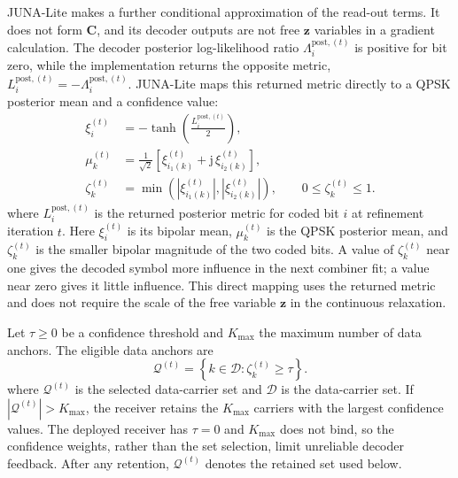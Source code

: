 \documentclass[conference]{IEEEtran}
\newcommand{\Dset}{\mathcal{D}}
\begin{document}
JUNA-Lite makes a further conditional approximation of the read-out terms.
It does not form \(\mathbf C\), and its decoder outputs are not free
\(\mathbf z\) variables in a gradient calculation.  The decoder posterior
log-likelihood ratio \(\Lambda_i^{\mathrm{post},(t)}\) is positive for bit
zero, while the implementation returns the opposite metric,
\(L_i^{\mathrm{post},(t)}=-\Lambda_i^{\mathrm{post},(t)}\).  JUNA-Lite maps
this returned metric directly to a QPSK posterior mean and a confidence value:
\begin{align}
  \xi_i^{(t)}
  &=-\tanh\!\left(\frac{L_i^{\mathrm{post},(t)}}{2}\right),
  \label{eq:lite-posterior-bit}\\
  \mu_k^{(t)}
  &=\frac{1}{\sqrt 2}
    \left[\xi_{i_1(k)}^{(t)}
    +\mathrm j\,\xi_{i_2(k)}^{(t)}\right],
  \label{eq:lite-posterior-mean}\\
  \zeta_k^{(t)}
  &=\min\!\left(
    \left|\xi_{i_1(k)}^{(t)}\right|,
    \left|\xi_{i_2(k)}^{(t)}\right|
    \right),
  \qquad 0\leq\zeta_k^{(t)}\leq1.
  \label{eq:lite-confidence}
\end{align}
where \(L_i^{\mathrm{post},(t)}\) is the returned posterior metric for coded
bit \(i\) at refinement iteration \(t\).  Here \(\xi_i^{(t)}\) is its
bipolar mean, \(\mu_k^{(t)}\) is the QPSK posterior mean, and
\(\zeta_k^{(t)}\) is the smaller bipolar magnitude of the two coded bits.
A value of \(\zeta_k^{(t)}\) near one gives the decoded symbol more influence
in the next combiner fit; a value near zero gives it little influence.  This
direct mapping uses the returned metric and does not require the scale of the
free variable \(\mathbf z\) in the continuous relaxation.

Let \(\tau\geq0\) be a confidence threshold and \(K_{\max}\) the maximum
number of data anchors.  The eligible data anchors are
\begin{equation}
  \mathcal Q^{(t)}
  =\left\{k\in\Dset:\zeta_k^{(t)}\geq\tau\right\}.
  \label{eq:lite-anchor-set}
\end{equation}
where \(\mathcal Q^{(t)}\) is the selected data-carrier set and \(\Dset\) is
the data-carrier set.  If \(|\mathcal Q^{(t)}|>K_{\max}\), the receiver
retains the \(K_{\max}\) carriers with the largest confidence values.  The
deployed receiver has \(\tau=0\) and \(K_{\max}\) does not bind, so the
confidence weights, rather than the set selection, limit unreliable decoder
feedback.  After any retention, \(\mathcal Q^{(t)}\) denotes the retained set
used below.
\end{document}
